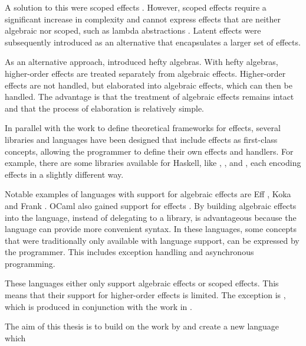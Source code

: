 A solution to this were scoped effects \cite{wu_effect_2014}. However, scoped effects require a significant increase in complexity and cannot express effects that are neither algebraic nor scoped, such as lambda abstractions \cite{oh_latent_2021}. Latent effects \cite{oh_latent_2021} were subsequently introduced as an alternative that encapsulates a larger set of effects.

As an alternative approach, \textcite{bach_poulsen_hefty_2023} introduced hefty algebras. With hefty algebras, higher-order effects are treated separately from algebraic effects. Higher-order effects are not handled, but elaborated into algebraic effects, which can then be handled. The advantage is that the treatment of algebraic effects remains intact and that the process of elaboration is relatively simple.

In parallel with the work to define theoretical frameworks for effects, several libraries and languages have been designed that include effects as first-class concepts, allowing the programmer to define their own effects and handlers. For example, there are some libraries available for Haskell, like , ,  and , each encoding effects in a slightly different way.

Notable examples of languages with support for algebraic effects are Eff \cite{bauer_programming_2015}, Koka \cite{leijen_type_2017} and Frank \cite{lindley_be_2017}. OCaml also gained support for effects \cite{sivaramakrishnan_retrofitting_2021}. By building algebraic effects into the language, instead of delegating to a library, is advantageous because the language can provide more convenient syntax. In these languages, some concepts that were traditionally only available with language support, can be expressed by the programmer. This includes exception handling and asynchronous programming.

These languages either only support algebraic effects or scoped effects. This means that their support for higher-order effects is limited. The exception is , which is produced in conjunction with the work in \cite{bach_poulsen_hefty_2023}.

The aim of this thesis is to build on the work by \citeauthor{bach_poulsen_hefty_2023} and create a new language which

